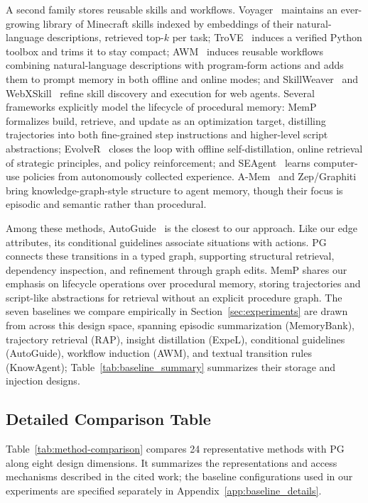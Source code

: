 A second family stores reusable skills and workflows. Voyager~\citep{wang2023voyager} maintains an ever-growing library of Minecraft skills indexed by embeddings of their natural-language descriptions, retrieved top-$k$ per task; TroVE~\citep{wang2024trove} induces a verified Python toolbox and trims it to stay compact; AWM~\citep{wang2025agent} induces reusable workflows combining natural-language descriptions with program-form actions and adds them to prompt memory in both offline and online modes; and SkillWeaver~\citep{zheng2025skillweaver} and WebXSkill~\citep{wang2026webxskill} refine skill discovery and execution for web agents. Several frameworks explicitly model the lifecycle of procedural memory: MemP~\citep{fang2025memp} formalizes build, retrieve, and update as an optimization target, distilling trajectories into both fine-grained step instructions and higher-level script abstractions; EvolveR~\citep{wu2025evolver} closes the loop with offline self-distillation, online retrieval of strategic principles, and policy reinforcement; and SEAgent~\citep{sun2025seagent} learns computer-use policies from autonomously collected experience. A-Mem~\citep{xu2026mem} and Zep/Graphiti~\citep{rasmussen2025zep} bring knowledge-graph-style structure to agent memory, though their focus is episodic and semantic rather than procedural.

Among these methods, AutoGuide~\citep{fu2024autoguide} is the closest to our approach. Like our edge attributes, its conditional guidelines associate situations with actions. PG connects these transitions in a typed graph, supporting structural retrieval, dependency inspection, and refinement through graph edits. MemP shares our emphasis on lifecycle operations over procedural memory, storing trajectories and script-like abstractions for retrieval without an explicit procedure graph. The seven baselines we compare empirically in Section~\ref{sec:experiments} are drawn from across this design space, spanning episodic summarization (MemoryBank), trajectory retrieval (RAP), insight distillation (ExpeL), conditional guidelines (AutoGuide), workflow induction (AWM), and textual transition rules (KnowAgent); Table~\ref{tab:baseline_summary} summarizes their storage and injection designs.

\subsection{Detailed Comparison Table}
\label{app:comparison}

Table~\ref{tab:method-comparison} compares 24 representative methods with PG along eight design dimensions. It summarizes the representations and access mechanisms described in the cited work; the baseline configurations used in our experiments are specified separately in Appendix~\ref{app:baseline_details}.

